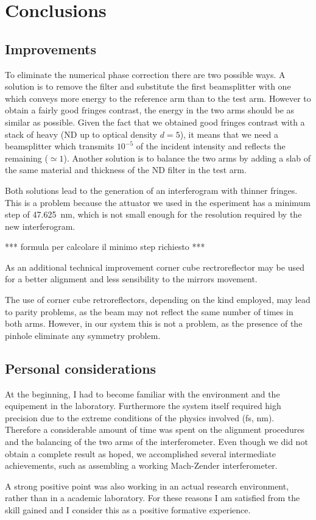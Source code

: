 \documentclass[12pt,a4paper,twoside]{article}
\begin{document}
\clearpage
\section{Conclusions}
\subsection{Improvements}
To eliminate the numerical phase correction there are two possible ways.
A solution is to remove the filter and substitute the first beamsplitter with one which conveys more energy to the reference arm than to the test arm.
However to obtain a fairly good fringes contrast, the energy in the two arms should be as similar as possible.
Given the fact that we obtained good fringes contrast with a stack of heavy (ND up to optical density $d=5$), it means that we need a beamsplitter which transmits $10^{-5}$ of the incident intensity and reflects the remaining ($\simeq 1$).
Another solution is to balance the two arms by adding a slab of the same material and thickness of the ND filter in the test arm.

Both solutions lead to the generation of an interferogram with thinner fringes.
This is a problem because the attuator we used in the esperiment has a minimum step of \SI{47.625}{\nm}, which is not small enough for the resolution required by the new interferogram.

*** formula per calcolare il minimo step richiesto ***

As an additional technical improvement corner cube rectroreflector may be used for a better alignment and less sensibility to the mirrors movement.

The use of corner cube retroreflectors, depending on the kind employed, may lead to parity problems, as the beam may not reflect the same number of times in both arms.
However, in our system this is not a problem, as the presence of the pinhole eliminate any symmetry problem.

\subsection{Personal considerations}
At the beginning, I had to become familiar with the environment and the equipement in the
laboratory.
Furthermore the system itself required high precision due to the extreme conditions of the physics involved (\si{\fs}, \si{\nm}).
Therefore a considerable amount of time was spent on the alignment procedures and the balancing of the two arms of the interferometer.
Even though we did not obtain a complete result as hoped, we accomplished several intermediate achievements, such as assembling a working Mach-Zender interferometer.

A strong positive point was also working in an actual research environment, rather than in a academic laboratory.
For these reasons I am satisfied from the skill gained and I consider this as a positive formative experience.

\clearpage

\end{document}
